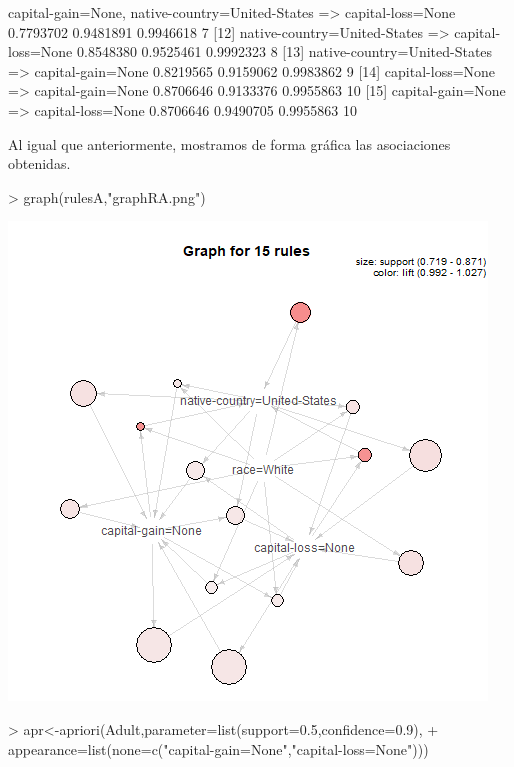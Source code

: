 \documentclass [a4paper] {article}
\begin{document}
{\begin{Schunk}
\begin{Soutput}
[11] {capital-gain=None,                                                                                    
      native-country=United-States} => {capital-loss=None}            0.7793702  0.9481891 0.9946618       7
[12] {native-country=United-States} => {capital-loss=None}            0.8548380  0.9525461 0.9992323       8
[13] {native-country=United-States} => {capital-gain=None}            0.8219565  0.9159062 0.9983862       9
[14] {capital-loss=None}            => {capital-gain=None}            0.8706646  0.9133376 0.9955863      10
[15] {capital-gain=None}            => {capital-loss=None}            0.8706646  0.9490705 0.9955863      10
\end{Soutput}
\end{Schunk}

\normalsize
\bigskip
Al igual que anteriormente, mostramos de forma gráfica las asociaciones obtenidas.
\begin{Schunk}
\begin{Sinput}
> graph(rulesA,"graphRA.png")
\end{Sinput}
\end{Schunk}
\includegraphics[width=\textwidth]{graphRA}

\begin{Schunk}
\begin{Sinput}
> apr<-apriori(Adult,parameter=list(support=0.5,confidence=0.9),
+     appearance=list(none=c("capital-gain=None","capital-loss=None")))
\end{Sinput}
\end{Schunk}

}
\end{document}
